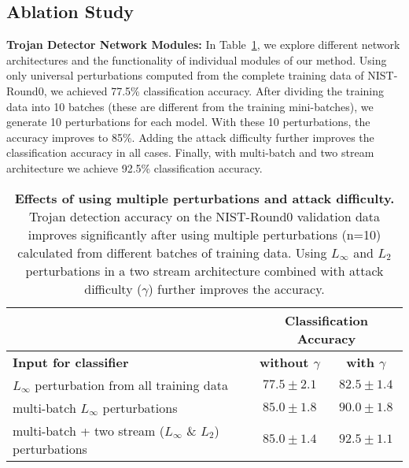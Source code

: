 \documentclass{article}
\begin{document}
 
\subsection{Ablation Study}
\vspace{-2mm}

{\bf Trojan Detector Network Modules:}
In Table~\ref{tab:tro_det}, we explore different network architectures and the functionality of individual modules of our method. Using only universal perturbations computed from the complete training data of NIST-Round0, we achieved 77.5\% classification accuracy. After dividing the training data into 10 batches (these are different from the training mini-batches), we generate 10 perturbations for each model. With these 10 perturbations, the accuracy improves to 85\%. Adding the attack difficulty further improves the classification accuracy in all cases. Finally, with multi-batch and two stream architecture we achieve 92.5\% classification accuracy. 

























\begin{table}[h!]
\caption{\textbf{Effects of using multiple perturbations and attack difficulty.} Trojan detection accuracy on the NIST-Round0 validation data improves significantly after using multiple perturbations (n=10) calculated from different batches of training data. Using $L_\infty$ and $L_2$ perturbations in a two stream architecture combined with attack difficulty ($\gamma$) further improves the accuracy.}
\begin{center}
\label{tab:tro_det}
\begin{tabular}{|l|c|c|}
\hline
 & \multicolumn{2}{c|}{\textbf{Classification Accuracy}} \\ 
\hline
\textbf{Input for classifier} & \textbf{without $\gamma$}  & \textbf{with $\gamma$} \\
 \hline
 \hline 
$L_\infty$ perturbation from all training data & $77.5\pm 2.1$  & $82.5\pm 1.4$ \\ \hline
multi-batch $L_\infty$ perturbations                             & $85.0\pm1.8$ & $90.0\pm1.8$  \\ \hline
 multi-batch + two stream ($L_\infty$ \& $L_2$) perturbations  & $85.0\pm1.4$ & $92.5\pm1.1$  \\ \hline

\end{tabular}
\end{center}
\end{table}
\end{document}
